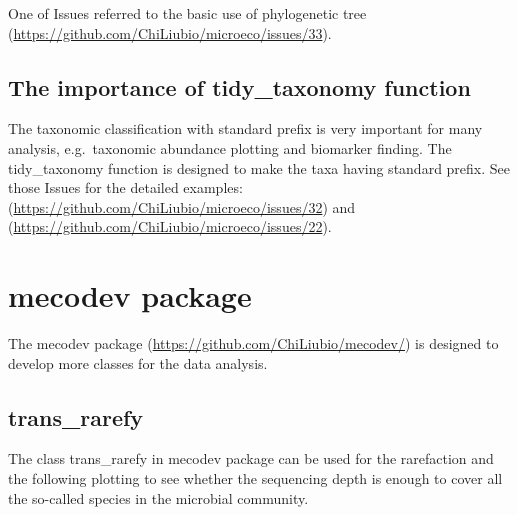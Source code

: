 \documentclass[
]{book}
\begin{document}
One of Issues referred to the basic use of phylogenetic tree (\url{https://github.com/ChiLiubio/microeco/issues/33}).

\hypertarget{the-importance-of-tidy_taxonomy-function}{%
\section{The importance of tidy\_taxonomy function}\label{the-importance-of-tidy_taxonomy-function}}

The taxonomic classification with standard prefix is very important for many analysis,
e.g.~taxonomic abundance plotting and biomarker finding.
The tidy\_taxonomy function is designed to make the taxa having standard prefix.
See those Issues for the detailed examples: (\url{https://github.com/ChiLiubio/microeco/issues/32}) and (\url{https://github.com/ChiLiubio/microeco/issues/22}).

\hypertarget{mecodev-package}{%
\chapter{mecodev package}\label{mecodev-package}}

The mecodev package (\url{https://github.com/ChiLiubio/mecodev/}) is designed to develop more classes for the data analysis.

\hypertarget{trans_rarefy}{%
\section{trans\_rarefy}\label{trans_rarefy}}

The class trans\_rarefy in mecodev package can be used for the rarefaction and the following plotting to see whether
the sequencing depth is enough to cover all the so-called species in the microbial community.

  
\end{document}
